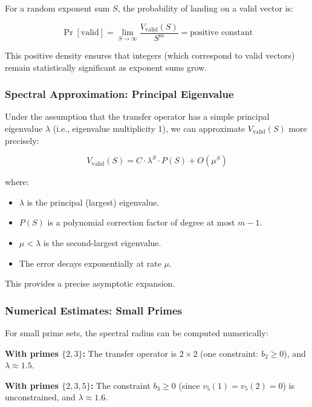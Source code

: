 For a random exponent sum $S$, the probability of landing on a valid vector is:

\begin{equation}
\Pr[\text{valid}] = \lim_{S \to \infty} \frac{V_{\text{valid}}(S)}{S^m} = \text{positive constant}
\end{equation}

This positive density ensures that integers (which correspond to valid vectors) remain statistically significant as exponent sums grow.

\subsubsection{Spectral Approximation: Principal Eigenvalue}

Under the assumption that the transfer operator has a simple principal eigenvalue $\lambda$ (i.e., eigenvalue multiplicity 1), we can approximate $V_{\text{valid}}(S)$ more precisely:

\begin{equation}
V_{\text{valid}}(S) = C \cdot \lambda^S \cdot P(S) + O(\mu^S)
\end{equation}

where:
\begin{itemize}
\item $\lambda$ is the principal (largest) eigenvalue.
\item $P(S)$ is a polynomial correction factor of degree at most $m-1$.
\item $\mu < \lambda$ is the second-largest eigenvalue.
\item The error decays exponentially at rate $\mu$.
\end{itemize}

This provides a precise asymptotic expansion.

\subsubsection{Numerical Estimates: Small Primes}

For small prime sets, the spectral radius can be computed numerically:

\textbf{With primes $\{2, 3\}$:} The transfer operator is $2 \times 2$ (one constraint: $b_2 \geq 0$), and $\lambda \approx 1.5$.

\textbf{With primes $\{2, 3, 5\}$:} The constraint $b_3 \geq 0$ (since $v_5(1) = v_5(2) = 0$) is unconstrained, and $\lambda \approx 1.6$.

